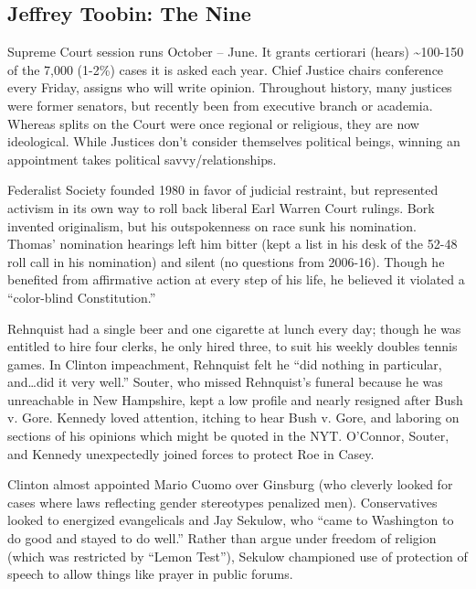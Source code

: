 \documentclass[
]{article}
\begin{document}
\hypertarget{jeffrey-toobin-the-nine}{%
\subsection{Jeffrey Toobin: The Nine}\label{jeffrey-toobin-the-nine}}

Supreme Court session runs October -- June. It grants certiorari (hears)
\textasciitilde100-150 of the 7,000 (1-2\%) cases it is asked each year.
Chief Justice chairs conference every Friday, assigns who will write
opinion. Throughout history, many justices were former senators, but
recently been from executive branch or academia. Whereas splits on the
Court were once regional or religious, they are now ideological. While
Justices don't consider themselves political beings, winning an
appointment takes political savvy/relationships.

Federalist Society founded 1980 in favor of judicial restraint, but
represented activism in its own way to roll back liberal Earl Warren
Court rulings. Bork invented originalism, but his outspokenness on race
sunk his nomination. Thomas' nomination hearings left him bitter (kept a
list in his desk of the 52-48 roll call in his nomination) and silent
(no questions from 2006-16). Though he benefited from affirmative action
at every step of his life, he believed it violated a ``color-blind
Constitution.''

Rehnquist had a single beer and one cigarette at lunch every day; though
he was entitled to hire four clerks, he only hired three, to suit his
weekly doubles tennis games. In Clinton impeachment, Rehnquist felt he
``did nothing in particular, and\ldots did it very well.'' Souter, who
missed Rehnquist's funeral because he was unreachable in New Hampshire,
kept a low profile and nearly resigned after Bush v. Gore. Kennedy loved
attention, itching to hear Bush v. Gore, and laboring on sections of his
opinions which might be quoted in the NYT. O'Connor, Souter, and Kennedy
unexpectedly joined forces to protect Roe in Casey.

Clinton almost appointed Mario Cuomo over Ginsburg (who cleverly looked
for cases where laws reflecting gender stereotypes penalized men).
Conservatives looked to energized evangelicals and Jay Sekulow, who
``came to Washington to do good and stayed to do well.'' Rather than
argue under freedom of religion (which was restricted by ``Lemon
Test''), Sekulow championed use of protection of speech to allow things
like prayer in public forums.
\end{document}
